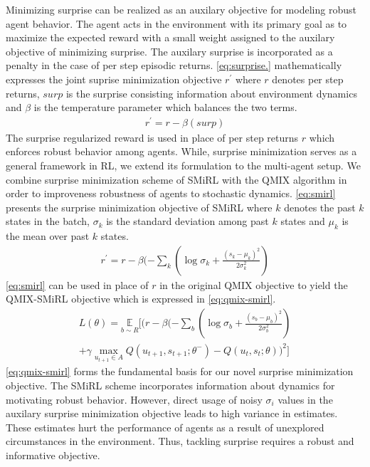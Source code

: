 \documentclass{article}
\begin{document}
\begin{multicols}{2}
Minimizing surprise can be realized as an auxilary objective for modeling robust agent behavior. The agent acts in the environment with its primary goal as to maximize the expected reward with a small weight assigned to the auxilary objective of minimizing surprise. The auxilary surprise is incorporated as a penalty in the case of per step episodic returns. \autoref{eq:surprise.} mathematically expresses the joint suprise minimization objective $r^{'}$ where $r$ denotes per step returns, $surp$ is the surprise consisting information about environment dynamics and $\beta$ is the temperature parameter which balances the two terms. 
\begin{gather}
  r^{'} = r - \beta(surp) \label{eq:surprise}
\end{gather}
The surprise regularized reward is used in place of per step returns $r$ which enforces robust behavior among agents. While, surprise minimization serves as a general framework in RL, we extend its formulation to the multi-agent setup. We combine surprise minimization scheme of SMiRL \cite{smirl} with the QMIX algorithm in order to improveness robustness of agents to stochastic dynamics. \autoref{eq:smirl} presents the surprise minimization objective of SMiRL where $k$ denotes the past $k$ states in the batch, $\sigma_{k}$ is the standard deviation among past $k$ states and $\mu_{k}$ is the mean over past $k$ states. 
\begin{gather}
  r^{'} = r - \beta(- \sum_{k}(\log\sigma_{k} + \frac{(s_{k} - \mu_{k})^{2}}{2\sigma_{k}^{2}}) \label{eq:smirl}
\end{gather}
\autoref{eq:smirl} can be used in place of $r$ in the original QMIX objective to yield the QMIX-SMiRL objective which is expressed in \autoref{eq:qmix-smirl}.
\begin{multline}
  L(\theta) = \underset{b \sim R}{\mathbb{E}}[(r - \beta(- \sum_{b}(\log\sigma_{b} + \frac{(s_{b} - \mu_{b})^{2}}{2\sigma_{b}^{2}})\\ + \gamma \underset{u_{t+1}\in A}{\max} Q(u_{t+1},s_{t+1};\theta^{-}) - Q(u_{t},s_{t};\theta))^{2}] \label{eq:qmix-smirl}
\end{multline}
\autoref{eq:qmix-smirl} forms the fundamental basis for our novel surprise minimization objective. The SMiRL scheme incorporates information about dynamics for motivating robust behavior. However, direct usage of noisy $\sigma_{i}$ values in the auxilary surprise minimization objective leads to high variance in estimates. These estimates hurt the performance of agents as a result of unexplored circumstances in the environment. Thus, tackling surprise requires a robust and informative objective.  

\end{multicols}
\end{document}
